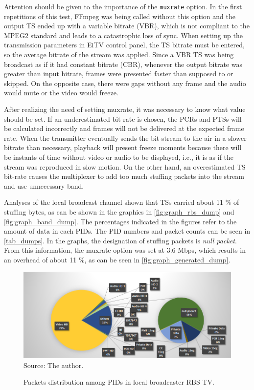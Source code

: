 \documentclass[
	12pt,				%
	openright,			%
	twoside,			%
	a4paper,			%
	brazil,
	french,				%
	english
	]{abntex2}
\begin{document}
Attention should be given to the importance of the \texttt{muxrate} option. In the first repetitions of this test, FFmpeg was being called without this option and the output TS ended up with a variable bitrate (VBR), which is not compliant to the MPEG2 standard and leads to a catastrophic loss of sync. When setting up the transmission parameters in EiTV control panel, the TS bitrate must be entered, so the average bitrate of the stream was applied. Since a VBR TS was being broadcast as if it had constant bitrate (CBR), whenever the output bitrate was greater than input bitrate, frames were presented faster than supposed to or skipped. On the opposite case, there were gaps without any frame and the audio would mute or the video would freeze.

After realizing the need of setting muxrate, it was necessary to know what value should be set. If an underestimated bit-rate is chosen, the PCRs and PTSs will be calculated incorrectly and frames will not be delivered at the expected frame rate. When the transmitter eventually sends the bit-stream to the air in a slower bitrate than necessary, playback will present freeze moments because there will be instants of time without video or audio to be displayed, i.e., it is as if the stream was reproduced in slow motion. On the other hand, an overestimated TS bit-rate causes the multiplexer to add too much stuffing packets into the stream and use unnecessary band.

Analyses of the local broadcast channel shown that TSs carried about 11 \% of stuffing bytes, as can be shown in the graphics in \autoref{fig:graph_rbs_dump} and \autoref{fig:graph_band_dump}. The percentages indicated in the figures refer to the amount of data in each PIDs. The PID numbers and packet counts can be seen in \autoref{tab_dumps}. In the graphs, the designation of stuffing packets is \textit{null packet}. From this information, the muxrate option was set at 3.6 Mbps, which results in an overhead of about 11 \%, as can be seen in \autoref{fig:graph_generated_dump}.

\begin{figure}[!h]
\centering
\caption{Packets distribution among PIDs in local broadcaster RBS TV.}
\includegraphics[width=0.9\linewidth]{figuras/graph_rbs_dump.png}
\\Source: The author.
\label{fig:graph_rbs_dump}
\end{figure}
\end{document}
